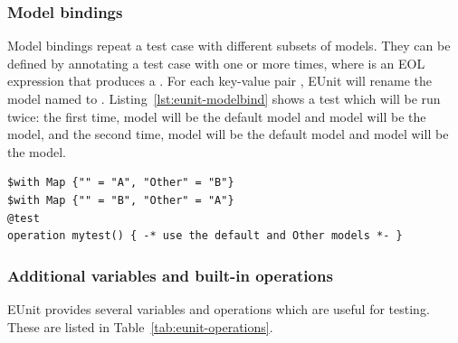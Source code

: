 \subsubsection{Model bindings}

Model bindings repeat a test case with different subsets of models. They can be defined by annotating a test case with  one or more times, where  is an EOL expression that produces a . For each key-value pair , EUnit will rename the model named  to . Listing~\ref{lst:eunit-modelbind} shows a test which will be run twice: the first time, model  will be the default model and model  will be the  model, and the second time, model  will be the default model and model  will be the  model.

\begin{lstlisting}[language=EOL,caption=Example of a model binding,label=lst:eunit-modelbind,columns=fixed,float]
$with Map {"" = "A", "Other" = "B"}
$with Map {"" = "B", "Other" = "A"}
@test
operation mytest() { -* use the default and Other models *- }
\end{lstlisting}

\subsubsection{Additional variables and built-in operations}

EUnit provides several variables and operations which are useful for testing. These are listed in Table~\ref{tab:eunit-operations}.

